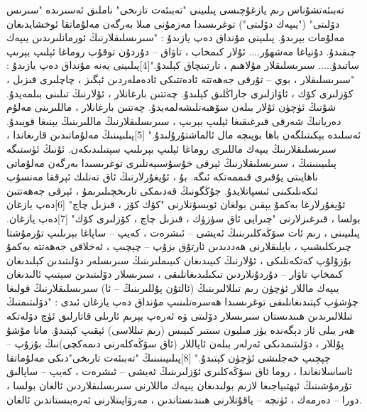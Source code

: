 \documentclass[a4paper]{article}
\begin{document}
\begin{flushright}
تەبىئەتشۇناس رىم يازغۇچىسى پىلىينى "تەبىئەت تارىخى" ناملىق ئەسىرىدە "سىرىس دۆلىتى" ("يىپەك دۆلىتى") توغرىسىدا مەزمۇنى مىلا بەرگەن مەلۇماتقا ئوخشايدىغان مەلۇمات بېرىدۇ. پىلىينى مۇنداق دەپ يازىدۇ : "سىرىسلىقلارنىڭ ئورمانلىرىدىن يىپەك چىقىدۇ. دۇنياغا مەشھۇر.... ئۇلار كىمخاپ ، تاۋاق – دۇردۇن توقۇپ روماغا ئېلىپ بېرىپ ساتىدۇ..... سىرىسلىقلار مۇلاھىم ، تارتىنچاق كېلىدۇ."[4]پىلىينى يەنە مۇنداق دەپ يازىدۇ : "سىرىسلىقلار ، بوي – تۇرقى جەھەتتە ئادەتتىكى ئادەملەردىن ئېگىز ، چاچلىرى قىزىل ، كۆزلىرى كۆك ، ئاۋازلىرى جاراڭلىق كېلىدۇ. چەتتىن بارغانلار ، ئۇلارنىڭ تىلىنى بىلمەيدۇ. شۇنىڭ ئۈچۈن ئۇلار بىلەن سۆھبەتلىشەلمەيدۇ. چەتتىن بارغانلار ، ماللىرىنى مەلۇم دەريانىڭ شەرقى قىرغىقىغا ئېلىپ بېرىپ ، سىرىسلىقلارنىڭ ماللىرىنىڭ يېنىغا قويىدۇ. ئەسلىدە بېكىتىلگەن باھا بويىچە مال ئالماشتۇرۇلىدۇ." [5]پىلىيىنىڭ مەلۇماتىدىن قارىغاندا ، سىرىسلىقلارنىڭ يىپەك ماللىرى روماغا ئېلىپ بېرىلىپ سېتىلىدىكەن. ئۇنىڭ ئۈستىگە پىلىيىنىنىڭ ، سىرىسلىقلارنىڭ ئېرقى خۇسۇسىيەتلىرى توغرىسىدا بەرگەن مەلۇماتى ناھايىتى يۇقىرى قىممەتكە ئىگە. بۇ ، ئۇيغۇرلارنىڭ ئاق تەنلىك ئېرققا مەنسۇپ ئىكەنلىكىنى ئىسپاتلايدۇ. جۇڭگونىڭ قەدىمكى تارىخچىلىرىمۇ ، ئېرقى جەھەتتىن ئۇيغۇرلارغا بەكمۇ يېقىن بولغان ئويسۇنلارنى "كۆك كۆز ، قىزىل چاچ" [6]دەپ يازغان بولسا ، قىرغىزلارنى "چىرايى ئاق سۈزۈك ، قىزىل چاچ ، كۆزلىرى كۆك" [7]دەپ يازغان. پىلىيىنى ، رىم ئات سۆڭەكلىرىنىڭ ئەيشى – ئىشرەت ، كەيپ – ساپاغا بېرىلىپ تۇرمۇشتا چىرىكلىشىپ ، بايلىقلارنى ھەددىدىن ئارتۇق بزۇپ – چېچىپ ، ئەخلاقى جەھەتتە بەكمۇ بۇزۇلۇپ كەتكەنلىكى ، ئۇلارنىڭ كىيىدىغان كىيىملىرىنىڭ سىرىسلەر دۆلىتىدىن كېلىدىغان كىمخاپ تاۋار – دۇردۇنلاردىن تىكىلىدىغانلىقى ، سىرىسلار دۆلىتىدىن سېتىپ ئالىدىغان يىپەك ماللار ئۈچۈن رىم تىللالىرىنىڭ (ئالتۇن پۇللىرىنىڭ – ئا) سىرىسلىقلارنىڭ قولىغا چۈشۈپ كېتىدىغانلىقى توغرىسىدا ھەسرەتلىنىپ مۇنداق دەپ يازغان ئىدى : "دۆلىتىمنىڭ تىللالىرىدىن ھىندىستان سىرىسلار دۆلىتى ۋە ئەرەپ يېرىم ئارىلى قاتارلىق ئۈچ دۆلەتكە ھەر يىلى ئاز دېگەندە يۈز مىليون سىتىر كىيىس (رىم تىللاسى) ئېقىپ كېتىدۇ. مانا مۇشۇ پۇللار ، دۆلىتىمدىكى ئەرلەر بىلەن ئاياللار (ئاق سۆڭەكلەرنى دىمەكچى)نىڭ بۇزۇپ – چېچىپ خەجلىشى ئۈچۈن كېتىدۇ." [8]پىلىيىنىنىڭ "تەبىئەت تارىخى"دىكى مەلۇماتقا ئاساسلانغاندا ، روما ئاق سۆڭەكلىرى ئۆزلىرىنىڭ ئەيشى – ئىشرەت ، كەيپ – ساپالىق تۇرمۇشىنىڭ ئېھتىياجىغا لازىم بولىدىغان يىپەك ماللارنى سىرىسلىقلاردىن ئالغان بولسا ، دورا – دەرمەك ، ئۈنچە – ياقۇتلارنى ھىندىستاندىن ، مەرۋايىتلارنى ئەرەبىستاندىن ئالغان.




\end{flushright}
\end{document}
